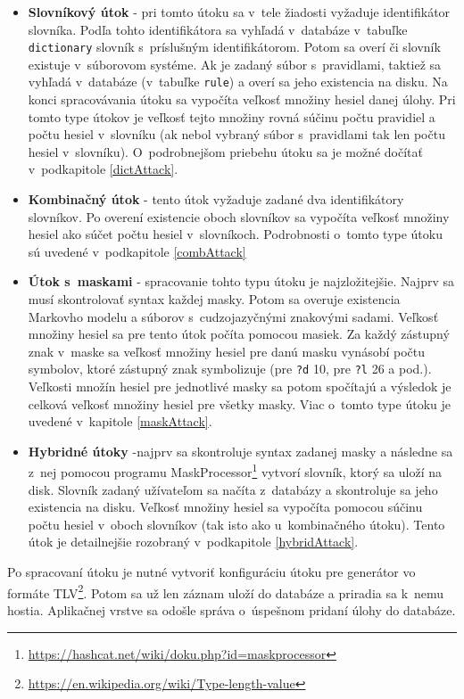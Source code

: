 \documentclass[slovak]{fitthesis}
\begin{document}
\begin{itemize}
    \item \textbf{Slovníkový útok} - pri tomto útoku sa v~tele žiadosti vyžaduje identifikátor slovníka. Podľa tohto identifikátora sa vyhľadá v~databáze v~tabuľke \texttt{dictionary} slovník s~príslušným identifikátorom. Potom sa overí či slovník existuje v~súborovom systéme. Ak je zadaný súbor s~pravidlami, taktiež sa vyhľadá v~databáze (v~tabuľke \texttt{rule}) a overí sa jeho existencia na disku. Na konci spracovávania útoku sa vypočíta veľkosť množiny hesiel danej úlohy. Pri tomto type útokov je veľkosť tejto množiny rovná súčinu počtu pravidiel a počtu hesiel v~slovníku (ak nebol vybraný súbor s~pravidlami tak len počtu hesiel v~slovníku). O~podrobnejšom priebehu útoku sa je možné dočítať v~podkapitole \ref{dictAttack}.
    \item \textbf{Kombinačný útok} - tento útok vyžaduje zadané dva identifikátory slovníkov. Po overení existencie oboch slovníkov sa vypočíta veľkosť množiny hesiel ako súčet počtu hesiel v~slovníkoch. Podrobnosti o~tomto type útoku sú uvedené v~podkapitole \ref{combAttack}
    \item \textbf{Útok s~maskami} - spracovanie tohto typu útoku je najzložitejšie. Najprv sa musí skontrolovať syntax každej masky. Potom sa overuje existencia Markovho modelu a súborov s~cudzojazyčnými znakovými sadami. Veľkosť množiny hesiel sa pre tento útok počíta pomocou masiek. Za každý zástupný znak v~maske sa veľkosť množiny hesiel pre danú masku vynásobí počtu symbolov, ktoré zástupný znak symbolizuje (pre \texttt{?d} 10, pre \texttt{?l} 26 a pod.). Veľkosti množín hesiel pre jednotlivé masky sa potom spočítajú a výsledok je celková veľkosť množiny hesiel pre všetky masky. Viac o~tomto type útoku je uvedené v~kapitole \ref{maskAttack}.
    \item \textbf{Hybridné útoky} -najprv sa skontroluje syntax zadanej masky a následne sa z~nej pomocou programu MaskProcessor\footnote{\url{https://hashcat.net/wiki/doku.php?id=maskprocessor}} vytvorí slovník, ktorý sa uloží na disk. Slovník zadaný užívateľom sa načíta z~databázy a skontroluje sa jeho existencia na disku. Veľkosť množiny hesiel sa vypočíta pomocou súčinu počtu hesiel v~oboch slovníkov (tak isto ako u~kombinačného útoku). Tento útok je detailnejšie rozobraný v~podkapitole \ref{hybridAttack}.
\end{itemize}
Po spracovaní útoku je nutné vytvoriť konfiguráciu útoku pre generátor vo formáte TLV\footnote{\url{https://en.wikipedia.org/wiki/Type-length-value}}. Potom sa už len záznam uloží do databáze a priradia sa k~nemu hostia. Aplikačnej vrstve sa odošle správa o~úspešnom pridaní úlohy do databáze.
\end{document}
